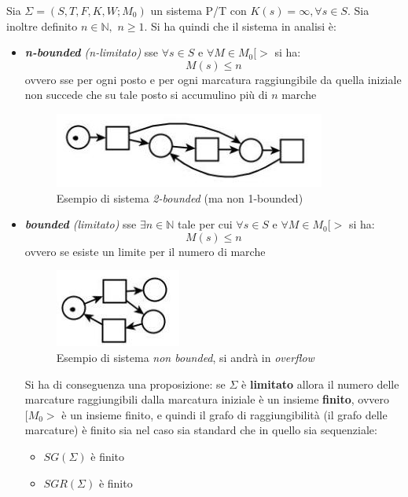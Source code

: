 \documentclass[a4paper,12pt, oneside]{book}
\begin{document}
\begin{definizione}
  Sia $\Sigma=(S,T,F,K,W;M_0)$ un sistema P/T con $K(s)=\infty,\forall s\in
  S$. Sia inoltre definito $n\in\mathbb{N},\,\,n\geq 1$. Si ha quindi che il
  sistema in analisi è:
  \begin{itemize}
    \item \textit{\textbf{n-bounded} (n-limitato)} sse $\forall s\in S$ e
    $\forall M\in 
    M_0[>$ si ha:
    \[M(s)\leq n\]
    ovvero sse per ogni posto e per ogni marcatura raggiungibile da quella
    iniziale non succede che su tale posto si accumulino più di $n$ marche
    \begin{figure}[H]
      \centering
      \includegraphics[scale = 0.55]{img/ptc4.jpg}
      \caption{Esempio di sistema \emph{2-bounded} (ma non 1-bounded)}
    \end{figure}
    \item \textit{\textbf{bounded} (limitato)} sse $\exists n\in\mathbb{N}$ tale
    per cui $\forall s\in S$ e $\forall M\in M_0[>$ si ha:
    \[M(s)\leq n\]
    ovvero se esiste un limite per il numero di marche
    \begin{figure}[H]
      \centering
      \includegraphics[scale = 0.55]{img/ptc5.jpg}
      \caption{Esempio di sistema \emph{non bounded}, si andrà in
        \emph{overflow}} 
    \end{figure}
    Si ha di conseguenza una proposizione:
    se $\Sigma$ è \textbf{limitato} allora il numero delle marcature
    raggiungibili dalla marcatura iniziale è un insieme \textbf{finito}, ovvero
    $[M_0>$ è un insieme finito, e quindi il grafo di raggiungibilità (il grafo
    delle marcature) è finito sia nel caso sia standard che in quello sia
    sequenziale: 
    \begin{itemize}
      \item $SG(\Sigma)$ è finito
      \item $SGR(\Sigma)$ è finito
    \end{itemize}

\end{itemize}
\end{definizione}
\end{document}
